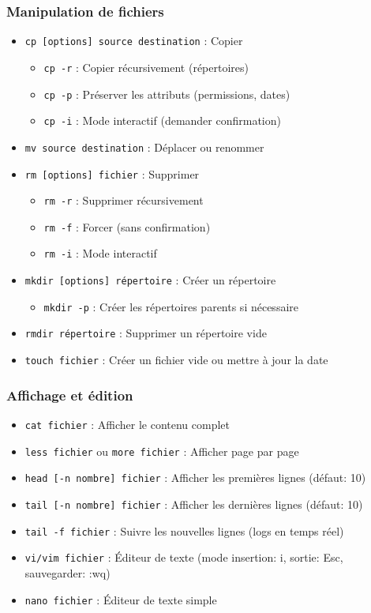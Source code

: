 \documentclass[12pt,a4paper]{article}
\begin{document}
\subsubsection{Manipulation de fichiers}
\begin{itemize}
    \item \texttt{cp [options] source destination} : Copier
    \begin{itemize}
        \item \texttt{cp -r} : Copier récursivement (répertoires)
        \item \texttt{cp -p} : Préserver les attributs (permissions, dates)
        \item \texttt{cp -i} : Mode interactif (demander confirmation)
    \end{itemize}
    \item \texttt{mv source destination} : Déplacer ou renommer
    \item \texttt{rm [options] fichier} : Supprimer
    \begin{itemize}
        \item \texttt{rm -r} : Supprimer récursivement
        \item \texttt{rm -f} : Forcer (sans confirmation)
        \item \texttt{rm -i} : Mode interactif
    \end{itemize}
    \item \texttt{mkdir [options] répertoire} : Créer un répertoire
    \begin{itemize}
        \item \texttt{mkdir -p} : Créer les répertoires parents si nécessaire
    \end{itemize}
    \item \texttt{rmdir répertoire} : Supprimer un répertoire vide
    \item \texttt{touch fichier} : Créer un fichier vide ou mettre à jour la date
\end{itemize}

\subsubsection{Affichage et édition}
\begin{itemize}
    \item \texttt{cat fichier} : Afficher le contenu complet
    \item \texttt{less fichier} ou \texttt{more fichier} : Afficher page par page
    \item \texttt{head [-n nombre] fichier} : Afficher les premières lignes (défaut: 10)
    \item \texttt{tail [-n nombre] fichier} : Afficher les dernières lignes (défaut: 10)
    \item \texttt{tail -f fichier} : Suivre les nouvelles lignes (logs en temps réel)
    \item \texttt{vi/vim fichier} : Éditeur de texte (mode insertion: i, sortie: Esc, sauvegarder: :wq)
    \item \texttt{nano fichier} : Éditeur de texte simple
\end{itemize}
\end{document}
